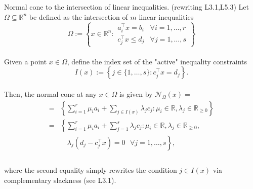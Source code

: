 \begin{theorem}[L7.1]{Normal cone to the intersection of linear inequalities. (rewriting L3.1,L5.3)}
    Let $\Omega \subseteq \mathbb{R}^n$ be defined as the intersection of $m$ linear inequalities
    \vspace{-4pt}\\
    {\footnotesize$$
    \Omega:=\left\{x \in \mathbb{R}^n: \begin{array}{ll}
        a_i^{\top} x=b_i & \forall i=1, \ldots, r \\
        c_j^{\top} x \leq d_j & \forall j=1, \ldots, s
        \end{array}\right\}
    $$}
    \vspace{-4pt}\\
    Given a point $x \in \Omega$, define the index set of the "active" inequality constraints
    \vspace{-4pt}\\
    $$
    I(x):=\left\{j \in\{1, \ldots, s\}: c_j^{\top} x=d_j\right\} .
    $$
    \vspace{-4pt}\\
    Then, the normal cone at any $x \in \Omega$ is given by $\mathcal{N}_{\Omega}(x)={}$
    \vspace{-4pt}\\
    {\footnotesize
    $$
    \begin{aligned}
    =&\left\{\sum_{i=1}^r \mu_i a_i+\sum_{j \in I(x)} \lambda_j c_j: \mu_i \in \mathbb{R}, \lambda_j \in \mathbb{R}_{\geq 0}\right\} \\
    =&\left\{\sum_{i=1}^r \mu_i a_i+\sum_{j=1}^s \lambda_j c_j: \mu_i \in \mathbb{R}, \lambda_j \in \mathbb{R}_{\geq 0}\right.,\\
    &\quad\left.\lambda_j\left(d_j-c_j^{\top} x\right)=0 \text{ } \forall j=1, \ldots, s\right\},\\
    \end{aligned}
    $$
    }
    \vspace{-4pt}\\
    where the second equality simply rewrites the condition $j \in I(x)$ via complementary slackness (see L3.1).
\end{theorem}

\newpage



